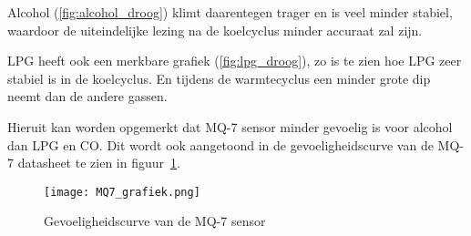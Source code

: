 Alcohol (\ref{fig:alcohol_droog}) klimt daarentegen trager en is veel minder stabiel, waardoor de uiteindelijke lezing na de koelcyclus minder accuraat zal zijn.

LPG heeft ook een merkbare grafiek (\ref{fig:lpg_droog}), zo is te zien hoe LPG zeer stabiel is in de koelcyclus. En tijdens de warmtecyclus een minder grote dip neemt dan de andere gassen. 

Hieruit kan worden opgemerkt dat MQ-7 sensor minder gevoelig is voor alcohol dan LPG en CO. Dit wordt ook aangetoond in de gevoeligheidscurve van de MQ-7 datasheet \autocite{mq7}
te zien in figuur~\ref{fig:MQ7_grafiek}.

\begin{figure}[t]
    \texttt{[image: MQ7\_grafiek.png]}
    \caption[Gevoeligheidscurve MQ-7]{Gevoeligheidscurve van de MQ-7 sensor \autocite{mq7}}
    \label{fig:MQ7_grafiek}
\end{figure}













